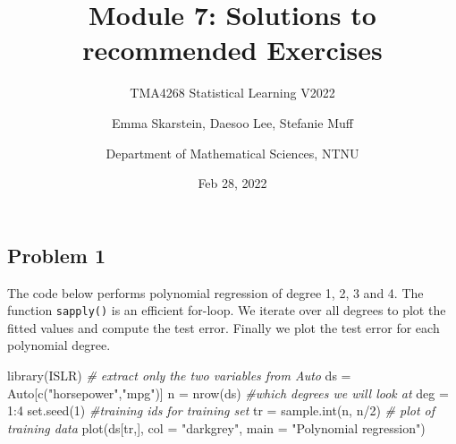 \documentclass[
]{article}
\title{Module 7: Solutions to recommended Exercises}
\subtitle{TMA4268 Statistical Learning V2022}
\author{Emma Skarstein, Daesoo Lee, Stefanie Muff \and Department of
Mathematical Sciences, NTNU}
\date{Feb 28, 2022}
\newenvironment{Shaded}{\begin{snugshade}}{\end{snugshade}}
\newcommand{\AttributeTok}[1]{\textcolor[rgb]{0.77,0.63,0.00}{#1}}
\newcommand{\CommentTok}[1]{\textcolor[rgb]{0.56,0.35,0.01}{\textit{#1}}}
\newcommand{\DecValTok}[1]{\textcolor[rgb]{0.00,0.00,0.81}{#1}}
\newcommand{\FunctionTok}[1]{\textcolor[rgb]{0.00,0.00,0.00}{#1}}
\newcommand{\NormalTok}[1]{#1}
\newcommand{\OtherTok}[1]{\textcolor[rgb]{0.56,0.35,0.01}{#1}}
\newcommand{\SpecialCharTok}[1]{\textcolor[rgb]{0.00,0.00,0.00}{#1}}
\newcommand{\StringTok}[1]{\textcolor[rgb]{0.31,0.60,0.02}{#1}}
\begin{document}
\maketitle

\hypertarget{problem-1}{%
\subsection{Problem 1}\label{problem-1}}

The code below performs polynomial regression of degree 1, 2, 3 and 4.
The function \texttt{sapply()} is an efficient for-loop. We iterate over
all degrees to plot the fitted values and compute the test error.
Finally we plot the test error for each polynomial degree.

\begin{Shaded}
\begin{Highlighting}[]
\FunctionTok{library}\NormalTok{(ISLR)}
\CommentTok{\# extract only the two variables from Auto}
\NormalTok{ds }\OtherTok{=}\NormalTok{ Auto[}\FunctionTok{c}\NormalTok{(}\StringTok{"horsepower"}\NormalTok{,}\StringTok{"mpg"}\NormalTok{)]}
\NormalTok{n }\OtherTok{=} \FunctionTok{nrow}\NormalTok{(ds)}
\CommentTok{\#which degrees we will look at}
\NormalTok{deg }\OtherTok{=} \DecValTok{1}\SpecialCharTok{:}\DecValTok{4}
\FunctionTok{set.seed}\NormalTok{(}\DecValTok{1}\NormalTok{)}
\CommentTok{\#training ids for training set}
\NormalTok{tr }\OtherTok{=} \FunctionTok{sample.int}\NormalTok{(n, n}\SpecialCharTok{/}\DecValTok{2}\NormalTok{)}
\CommentTok{\# plot of training data}
\FunctionTok{plot}\NormalTok{(ds[tr,], }\AttributeTok{col =} \StringTok{"darkgrey"}\NormalTok{, }\AttributeTok{main =} \StringTok{"Polynomial regression"}\NormalTok{)}


\end{Highlighting}
\end{Shaded}
\end{document}
